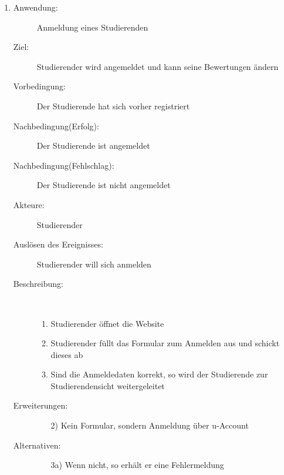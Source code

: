\documentclass[parskip=full]{scrartcl}
\newcommand{\swtLabel}[1]{\textbf{\textbackslash #1\arabic*0\textbackslash}}
\begin{document}
\begin{enumerate}[label=\swtLabel{S}]
  \item
    \begin{description}
    \item[Anwendung:] Anmeldung eines Studierenden
    \item[Ziel:] Studierender wird angemeldet und kann seine Bewertungen ändern
  	\item[Vorbedingung:] Der Studierende hat sich vorher registriert
  	\item[Nachbedingung(Erfolg):] Der Studierende ist angemeldet
  	\item[Nachbedingung(Fehlschlag):] Der Studierende ist nicht angemeldet
  	\item[Akteure:] Studierender
  	\item[Auslösen des Ereignisses:] Studierender will sich anmelden
  	\item[Beschreibung:]~
  	\begin{enumerate}
  	  \item Studierender öffnet die Website
  	  \item Studierender füllt das Formular zum Anmelden aus und schickt dieses
  	  ab
  	  \item Sind die Anmeldedaten korrekt, so wird der Studierende zur
  	  Studierendensicht weitergeleitet
  	\end{enumerate}
  	\item[Erweiterungen:]
  	\begin{enumerate}
  	  \item[2)] Kein Formular, sondern Anmeldung über u-Account
  	\end{enumerate}    	
  	\item[Alternativen:]
	\begin{enumerate}
  	  \item[3a)] Wenn nicht, so erhält er eine Fehlermeldung
  	\end{enumerate}
  \end{description}
   

\end{enumerate}
\end{document}
